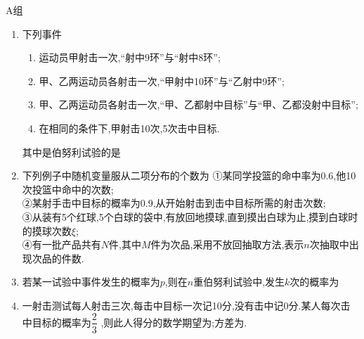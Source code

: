 A组
\begin{enumerate}
\item 下列事件
\begin{enumerate}
    \item 运动员甲射击一次,“射中9环”与“射中8环”;
    \item 甲、乙两运动员各射击一次,“甲射中10环”与“乙射中9环”;
    \item 甲、乙两运动员各射击一次,“甲、乙都射中目标”与“甲、乙都没射中目标”;
    \item 在相同的条件下,甲射击10次,5次击中目标.
\end{enumerate}其中是伯努利试验的是

\item 下列例子中随机变量服从二项分布的个数为
①某同学投篮的命中率为0.6,他10次投篮中命中的次数;\\
②某射手击中目标的概率为0.9,从开始射击到击中目标所需的射击次数;\\
③从装有5个红球,5个白球的袋中,有放回地摸球,直到摸出白球为止,摸到白球时的摸球次数$\xi$;\\
④有一批产品共有$N$件,其中$M$件为次品,采用不放回抽取方法,表示$n$次抽取中出现次品的件数.

\item 若某一试验中事件发生的概率为$p$,则在$n$重伯努利试验中,发生$k$次的概率为

\item 一射击测试每人射击三次,每击中目标一次记10分,没有击中记0分.某人每次击中目标的概率为$\dfrac{2}{3}$ ,则此人得分的数学期望为;方差为.

\end{enumerate}


